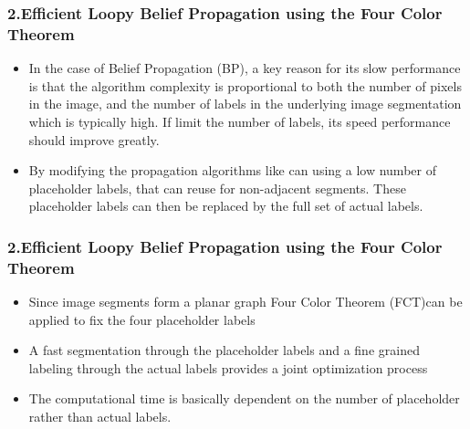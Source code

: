 \documentclass{beamer}
\begin{document}
\begin{frame}
\frametitle{\textbf{2.Efficient Loopy Belief Propagation using the Four Color Theorem}}
\begin{itemize}
\item In the case of Belief Propagation (BP), a key reason for its slow performance is that the algorithm complexity is proportional to both the number
of pixels in the image, and the number of labels in the underlying image segmentation
which is typically high. If  limit the number of labels, its speed performance should improve greatly.
\item By modifying the propagation algorithms like can using a low number of placeholder
labels, that can reuse for non-adjacent segments. These placeholder labels
can then be replaced by the full set of actual labels.
\end{itemize}
\end{frame}

\begin{frame}
\frametitle{\textbf{2.Efficient Loopy Belief Propagation using the Four Color Theorem}}
\begin{itemize}
\item Since image segments form a planar graph Four Color Theorem (FCT)can be applied to fix the four placeholder labels
\item A fast segmentation through the placeholder labels and a fine grained labeling through the
actual labels provides a joint optimization process
\item  The computational time is basically dependent on the number
of placeholder rather than actual labels.
\end{itemize}
\end{frame}
\end{document}
